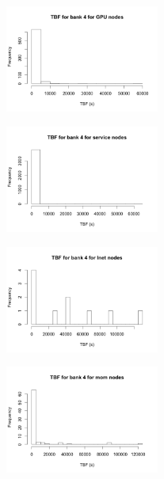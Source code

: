 \begin{t able}[t]
\begin{figure}
\centering
\includegraphics[width=0.45\textwidth]{images/tbf_4_g.png}
\end{figure}

\begin{figure}
\centering
\includegraphics[width=0.45\textwidth]{images/tbf_4_s.png}
\end{figure}

\begin{figure}
\centering
\includegraphics[width=0.45\textwidth]{images/tbf_4_l.png}
\end{figure}

\begin{figure}
\centering
\includegraphics[width=0.45\textwidth]{images/tbf_4_m.png}
\end{figure}


\end{t able}
